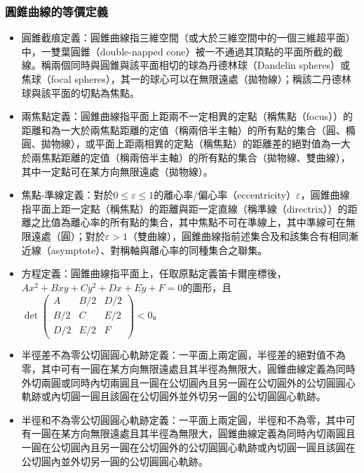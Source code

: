 \documentclass[a4paper,12pt]{article}
\begin{document}
\subsubsection{圓錐曲線的等價定義}
\begin{itemize}
\item 圓錐截痕定義：圓錐曲線指三維空間（或大於三維空間中的一個三維超平面）中，一雙葉圓錐（double-napped cone）被一不通過其頂點的平面所截的截線。稱兩個同時與圓錐與該平面相切的球為丹德林球（Dandelin spheres）或焦球（focal spheres），其一的球心可以在無限遠處（拋物線）；稱該二丹德林球與該平面的切點為焦點。
\item 兩焦點定義：圓錐曲線指平面上距兩不一定相異的定點（稱焦點（focus））的距離和為一大於兩焦點距離的定值（稱兩倍半主軸）的所有點的集合（圓、橢圓、拋物線），或平面上距兩相異的定點（稱焦點）的距離差的絕對值為一大於兩焦點距離的定值（稱兩倍半主軸）的所有點的集合（拋物線、雙曲線），其中一定點可在某方向無限遠處（拋物線）。
\item 焦點-準線定義：對於$0\leq\varepsilon\leq 1$的離心率/偏心率（eccentricity）$\varepsilon$，圓錐曲線指平面上距一定點（稱焦點）的距離與距一定直線（稱準線（directrix））的距離之比值為離心率的所有點的集合，其中焦點不可在準線上，其中準線可在無限遠處（圓）；對於$\varepsilon>1$（雙曲線），圓錐曲線指前述集合及和該集合有相同漸近線（asymptote）、對稱軸與離心率的同種集合之聯集。
\item 方程定義：圓錐曲線指平面上，任取原點定義笛卡爾座標後，$Ax^2+Bxy+Cy^2+Dx+Ey+F=0$的圖形，且$\det\begin{pmatrix} A & B/2 & D/2 \\ B/2 & C & E/2 \\ D/2 & E/2 & F \end{pmatrix}<0$。
\item 半徑差不為零公切圓圓心軌跡定義：一平面上兩定圓，半徑差的絕對值不為零，其中可有一圓在某方向無限遠處且其半徑為無限大，圓錐曲線定義為同時外切兩圓或同時內切兩圓且一圓在公切圓內且另一圓在公切圓外的公切圓圓心軌跡或內切圓一圓且該圓在公切圓外並外切另一圓的公切圓圓心軌跡。
\item 半徑和不為零公切圓圓心軌跡定義：一平面上兩定圓，半徑和不為零，其中可有一圓在某方向無限遠處且其半徑為無限大，圓錐曲線定義為同時內切兩圓且一圓在公切圓內且另一圓在公切圓外的公切圓圓心軌跡或內切圓一圓且該圓在公切圓內並外切另一圓的公切圓圓心軌跡。
\end{itemize}
\end{document}
